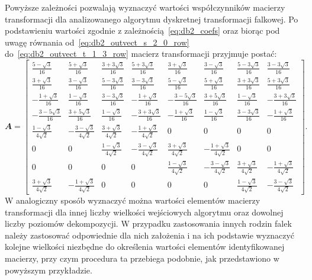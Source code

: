 Powyższe zależności pozwalają wyznaczyć wartości współczynników macierzy transformacji dla analizowanego algorytmu dyskretnej transformacji falkowej. Po podstawieniu wartości zgodnie z zależnością~\eqref{eq:db2_coefs} oraz biorąc pod uwagę równania od~\eqref{eq:db2_outvect_s_2_0_row} do~\eqref{eq:db2_outvect_t_1_3_row} macierz transformacji przyjmuje postać:
\begin{equation}
\mathbfit{A} =
\begin{bmatrix}
\frac{5 - \sqrt{3}}{16} & \frac{5 + \sqrt{3}}{16} & \frac{3 + 3 \sqrt{3}}{16} & \frac{5 + 3 \sqrt{3}}{16} & \frac{3 + \sqrt{3}}{16} & \frac{3 - \sqrt{3}}{16} & \frac{5 - 3 \sqrt{3}}{16} & \frac{3 - 3 \sqrt{3}}{16} \\
\frac{3 + \sqrt{3}}{16} & \frac{3 - \sqrt{3}}{16} & \frac{5 - 3 \sqrt{3}}{16} & \frac{3 - 3 \sqrt{3}}{16} & \frac{5 - \sqrt{3}}{16} & \frac{5 + \sqrt{3}}{16} & \frac{3 + 3 \sqrt{3}}{16} & \frac{5 + 3 \sqrt{3}}{16} \\
- \frac{1 + \sqrt{3}}{16} & \frac{1 - \sqrt{3}}{16} & \frac{3 - 3 \sqrt{3}}{16} & - \frac{1 + \sqrt{3}}{16} & - \frac{3 - 5 \sqrt{3}}{16} & \frac{3 + 5 \sqrt{3}}{16} & \frac{1 - \sqrt{3}}{16} & - \frac{3 + 3 \sqrt{3}}{16} \\
- \frac{3 - 5 \sqrt{3}}{16} & \frac{3 + 5 \sqrt{3}}{16} & \frac{1 - \sqrt{3}}{16} & - \frac{3 + 3 \sqrt{3}}{16} & - \frac{1 + \sqrt{3}}{16} & \frac{1 - \sqrt{3}}{16} & \frac{3 - 3 \sqrt{3}}{16} & - \frac{1 + \sqrt{3}}{16} \\
\frac{1 - \sqrt{3}}{4 \sqrt{2}} & - \frac{3 - \sqrt{3}}{4 \sqrt{2}} & \frac{3 + \sqrt{3}}{4 \sqrt{2}} & - \frac{1 + \sqrt{3}}{4 \sqrt{2}} & 0 & 0 & 0 & 0 \\
0 & 0 & \frac{1 - \sqrt{3}}{4 \sqrt{2}} & - \frac{3 - \sqrt{3}}{4 \sqrt{2}} & \frac{3 + \sqrt{3}}{4 \sqrt{2}} & - \frac{1 + \sqrt{3}}{4 \sqrt{2}} & 0 & 0 \\
0 & 0 & 0 & 0 & \frac{1 - \sqrt{3}}{4 \sqrt{2}} & - \frac{3 - \sqrt{3}}{4 \sqrt{2}} & \frac{3 + \sqrt{3}}{4 \sqrt{2}} & - \frac{1 + \sqrt{3}}{4 \sqrt{2}} \\
\frac{3 + \sqrt{3}}{4 \sqrt{2}} & - \frac{1 + \sqrt{3}}{4 \sqrt{2}} & 0 & 0 & 0 & 0 & \frac{1 - \sqrt{3}}{4 \sqrt{2}} & - \frac{3 - \sqrt{3}}{4 \sqrt{2}}
\end{bmatrix}
\label{eq:db2_2_8_matrix}.
\end{equation}
W analogiczny sposób wyznaczyć można wartości elementów macierzy transformacji dla innej liczby wielkości wejściowych algorytmu oraz dowolnej liczby poziomów dekompozycji. W przypadku zastosowania innych rodzin falek należy zastosować odpowiednie dla nich założenia i na ich podstawie wyznaczyć kolejne wielkości niezbędne do określenia wartości elementów identyfikowanej macierzy, przy czym procedura ta przebiega podobnie, jak przedstawiono w powyższym przykładzie.

